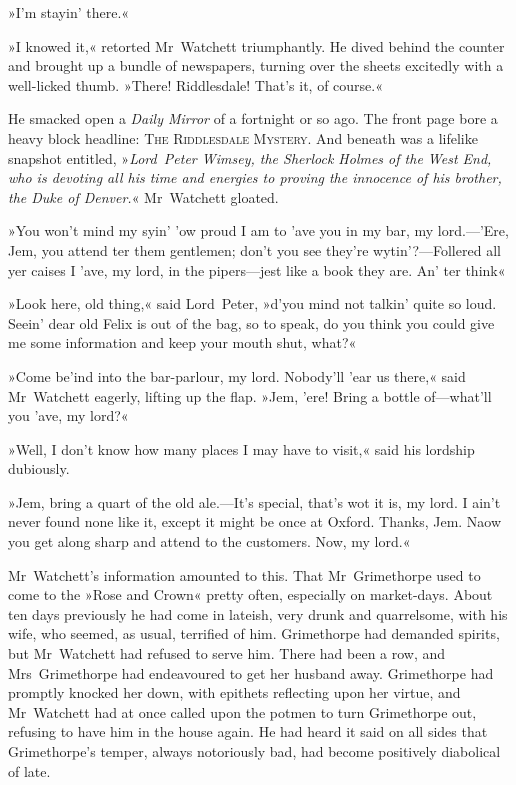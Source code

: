 »I'm stayin' there.«

»I knowed it,« retorted Mr~Watchett triumphantly. He dived behind the counter and brought up a bundle of newspapers, turning over the sheets excitedly with a well-licked thumb. »There! Riddlesdale! That's it, of course.«

He smacked open a \textit{Daily Mirror} of a fortnight or so ago. The front page bore a heavy block headline: \textsc{The Riddlesdale Mystery}. And beneath was a lifelike snapshot entitled, »\textit{Lord~Peter Wimsey, the Sherlock Holmes of the West End, who is devoting all his time and energies to proving the innocence of his brother, the Duke of Denver.}« Mr~Watchett gloated.

»You won't mind my syin' 'ow proud I am to 'ave you in my bar, my lord.—'Ere, Jem, you attend ter them gentlemen; don't you see they're wytin'?—Follered all yer caises I 'ave, my lord, in the pipers—jest like a book they are. An' ter think\longdash«

»Look here, old thing,« said Lord~Peter, »d'you mind not talkin' quite so loud. Seein' dear old Felix is out of the bag, so to speak, do you think you could give me some information and keep your mouth shut, what?«

»Come be'ind into the bar-parlour, my lord. Nobody'll 'ear us there,« said Mr~Watchett eagerly, lifting up the flap. »Jem, 'ere! Bring a bottle of—what'll you 'ave, my lord?«

»Well, I don't know how many places I may have to visit,« said his lordship dubiously.

»Jem, bring a quart of the old ale.—It's special, that's wot it is, my lord. I ain't never found none like it, except it might be once at Oxford. Thanks, Jem. Naow you get along sharp and attend to the customers. Now, my lord.«

Mr~Watchett's information amounted to this. That Mr~Grimethorpe used to come to the »Rose and Crown« pretty often, especially on market-days. About ten days previously he had come in lateish, very drunk and quarrelsome, with his wife, who seemed, as usual, terrified of him. Grimethorpe had demanded spirits, but Mr~Watchett had refused to serve him. There had been a row, and Mrs~Grimethorpe had endeavoured to get her husband away. Grimethorpe had promptly knocked her down, with epithets reflecting upon her virtue, and Mr~Watchett had at once called upon the potmen to turn Grimethorpe out, refusing to have him in the house again. He had heard it said on all sides that Grimethorpe's temper, always notoriously bad, had become positively diabolical of late.

